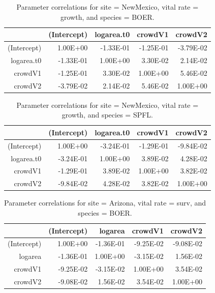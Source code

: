 \documentclass[12pt,]{article}
\begin{document}
\begin{table}[ht]
\centering
\caption{Parameter correlations for site = NewMexico, vital rate = growth, and species = BOER.} 
\begin{tabular}{rrrrr}
  \hline
 & (Intercept) & logarea.t0 & crowdV1 & crowdV2 \\ 
  \hline
(Intercept) & 1.00E+00 & -1.33E-01 & -1.25E-01 & -3.79E-02 \\ 
  logarea.t0 & -1.33E-01 & 1.00E+00 & 3.30E-02 & 2.14E-02 \\ 
  crowdV1 & -1.25E-01 & 3.30E-02 & 1.00E+00 & 5.46E-02 \\ 
  crowdV2 & -3.79E-02 & 2.14E-02 & 5.46E-02 & 1.00E+00 \\ 
   \hline
\end{tabular}
\end{table}

\begin{table}[ht]
\centering
\caption{Parameter correlations for site = NewMexico, vital rate = growth, and species = SPFL.} 
\begin{tabular}{rrrrr}
  \hline
 & (Intercept) & logarea.t0 & crowdV1 & crowdV2 \\ 
  \hline
(Intercept) & 1.00E+00 & -3.24E-01 & -1.29E-01 & -9.84E-02 \\ 
  logarea.t0 & -3.24E-01 & 1.00E+00 & 3.89E-02 & 4.28E-02 \\ 
  crowdV1 & -1.29E-01 & 3.89E-02 & 1.00E+00 & 3.82E-02 \\ 
  crowdV2 & -9.84E-02 & 4.28E-02 & 3.82E-02 & 1.00E+00 \\ 
   \hline
\end{tabular}
\end{table}

\newpage{}

\begin{table}[ht]
\centering
\caption{Parameter correlations for site = Arizona, vital rate = surv, and species = BOER.} 
\begin{tabular}{rrrrr}
  \hline
 & (Intercept) & logarea & crowdV1 & crowdV2 \\ 
  \hline
(Intercept) & 1.00E+00 & -1.36E-01 & -9.25E-02 & -9.08E-02 \\ 
  logarea & -1.36E-01 & 1.00E+00 & -3.15E-02 & 1.56E-02 \\ 
  crowdV1 & -9.25E-02 & -3.15E-02 & 1.00E+00 & 3.54E-02 \\ 
  crowdV2 & -9.08E-02 & 1.56E-02 & 3.54E-02 & 1.00E+00 \\ 
   \hline
\end{tabular}
\end{table}
\end{document}
